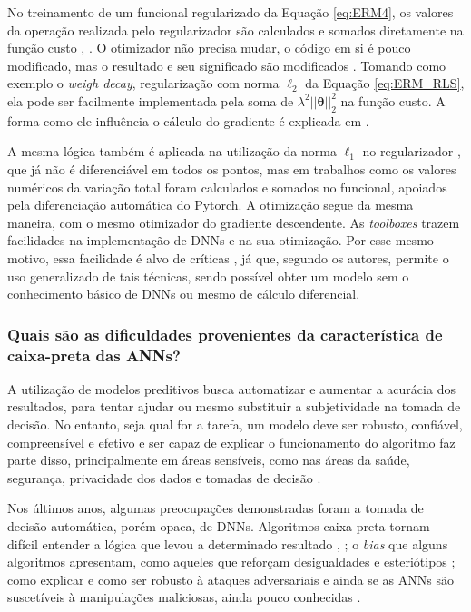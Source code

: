 No treinamento de um funcional regularizado da Equação \eqref{eq:ERM4}, os valores da operação realizada pelo regularizador são calculados e somados diretamente na função custo \cite[Seção 7.1]{goodfellow2016deep}, \cite{2017kukacka}. O otimizador não precisa mudar, o código em si é pouco modificado, mas o resultado e seu significado são modificados \cite[pág. 106]{nielsen2018}. Tomando como exemplo o \textit{weigh decay}, regularização com norma $\ell_2$ da Equação \eqref{eq:ERM_RLS}, ela pode ser facilmente implementada pela soma de $\lambda^2 \vert \vert \bm{\theta} \vert \vert^2_2$ na função custo. A forma como ele influência o cálculo do gradiente é explicada em \cite[págs. 78-80]{nielsen2018}. 

A mesma lógica também é aplicada na utilização da norma $\ell_1$ no regularizador \cite[págs. 87-8]{nielsen2018}, que já não é diferenciável em todos os pontos, mas em trabalhos como \cite{Baguer2020} os valores numéricos da variação total foram calculados e somados no funcional, apoiados pela diferenciação automática do Pytorch. A otimização segue da mesma maneira, com o mesmo otimizador do gradiente descendente. As \textit{toolboxes} trazem facilidades na implementação de DNNs e na sua otimização. Por esse mesmo motivo, essa facilidade é alvo de críticas \cite{Cinelli2021}, já que, segundo os autores,  permite o uso generalizado de tais técnicas, sendo possível obter um modelo sem o conhecimento básico de DNNs ou mesmo de cálculo diferencial. 


\subsubsection{Quais são as dificuldades provenientes da característica de caixa-preta das ANNs?}\label{Ap:interpretability}


A utilização de modelos preditivos busca automatizar e aumentar a acurácia dos resultados, para tentar ajudar ou mesmo substituir a subjetividade na tomada de decisão. No entanto, seja qual for a tarefa, um modelo deve ser robusto, confiável, compreensível e efetivo \cite{DelosReyes2016}  e ser capaz de explicar o funcionamento do algoritmo faz parte disso, principalmente em áreas sensíveis, como nas áreas da saúde, segurança, privacidade dos dados e tomadas de decisão \cite{Mertz2020, Zhang2020}.  

 Nos últimos anos, algumas preocupações demonstradas foram a tomada de decisão automática, porém opaca, de DNNs. Algoritmos caixa-preta tornam difícil entender  a lógica que levou a determinado resultado \cite[Capítulo 6]{geron2019hands-on},
\cite{Mertz2020}; o \textit{bias} que alguns algoritmos apresentam, como aqueles que reforçam desigualdades e esteriótipos \cite{neudert2020, Mertz2020}; como explicar e como ser robusto à ataques adversariais e ainda se as ANNs são suscetíveis à manipulações maliciosas, ainda pouco conhecidas \cite{Zhang2020}. 

